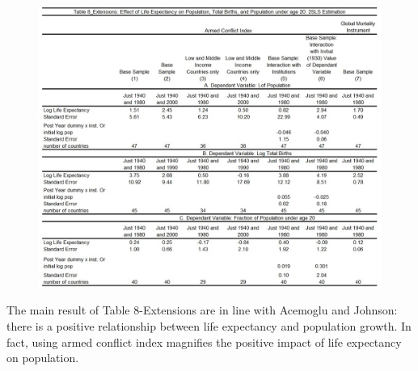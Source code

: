 \documentclass[11pt]{article}
\begin{document}
\begin{figure} [H]
\centering
\includegraphics[width=\textwidth]{table8ex}
\label{table8ex}
\end{figure}
The main result of Table 8-Extensions are in line with Acemoglu and Johnson: there is a positive relationship between life expectancy and population growth. In fact, using armed conflict index magnifies the positive impact of life expectancy on population. 
\end{document}
